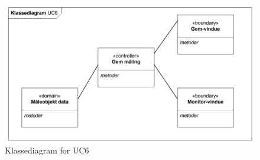 \begin{figure}[H]
	\centering
	\includegraphics[width=1\textwidth]{Figurer/Snip20151104_42}
	\caption{Klassediagram for UC6}
\end{figure}












